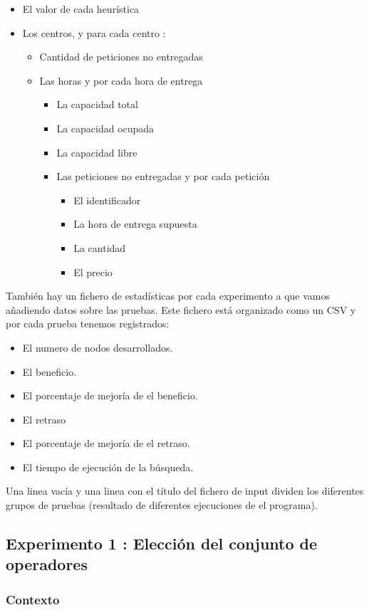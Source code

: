 \documentclass{article}
\begin{document}
\begin{itemize}
\item El valor de cada heurística
\item Los centros, y para cada centro :
	\begin{itemize}
		\item Cantidad de peticiones no entregadas
		\item Las horas y por cada hora de entrega
		\begin{itemize}		
			\item La capacidad total
			\item La capacidad ocupada
			\item La capacidad libre
			\item Las peticiones no entregadas y por cada petición		
			\begin{itemize}
			\item El identificador
			\item La hora de entrega supuesta
			\item La cantidad
			\item El precio
			\end{itemize}
		\end{itemize}
	\end{itemize}
\end{itemize}
También hay un fichero de estadísticas por cada experimento a que vamos
añadiendo datos sobre las pruebas. Este fichero está organizado como un CSV y
por cada prueba tenemos registrados:
\begin{itemize}
\item El numero de nodos desarrollados. 
\item El beneficio.
\item El porcentaje de mejoría de el beneficio.
\item El retraso
\item El porcentaje de mejoría de el retraso.
\item El tiempo de ejecución de la búsqueda.
\end{itemize}
Una linea vacía y una linea con el título del fichero de input dividen los diferentes grupos de pruebas (resultado de diferentes ejecuciones de el programa).

\subsection{Experimento 1 : Elección del conjunto de operadores}

\subsubsection{Contexto}
\end{document}
